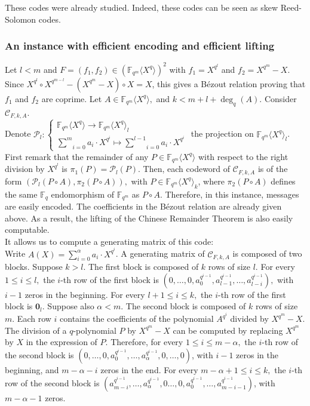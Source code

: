 \documentclass{article}
\newcommand{\Fq}{\mathbb{F}_q}
\newcommand{\Fqm}{\mathbb{F}_{q^m}}
\newcommand{\QP}{\mathbb{F}_{q^m} \langle X^q \rangle}
\theoremstyle{definition}
\begin{document}
\noindent These codes were already studied. Indeed, these codes can be seen as skew Reed-Solomon codes.


\subsubsection{An instance with efficient encoding and efficient lifting}

Let $l <m$ and $F=(f_1, f_2)\in (\QP)^2$ with $f_1 = X^{q^l}$ and $f_2=X^{q^m}-X$. Since $ X^{q^l} \circ X^{q^{m-l}}-(X^{q^m}-X)\circ X = X$, this gives a Bézout relation proving that $f_1$ and $f_2$ are coprime. Let $A\in \QP,$ and $k<m+l+\deg_q(A).$ Consider $\mathcal{C}_{F,k,A}$. \\
Denote $\mathcal{P}_l : \left\{\begin{array}{l}
            \QP \rightarrow \QP_{l} \\
            \underset{i = 0}{\overset{m}{\sum}} a_i \cdot X^{q^i} \mapsto \underset{i =
                                                                                0}{\overset{l-1}{\sum}} a_i \cdot X^{q^i}
      \end{array}\right.$ the projection on $\QP_{l}$. \\
First remark that the remainder of any $P \in \QP$ with respect to the right division by $X^{q^l}$ is $\pi_1(P)=\mathcal{P}_l(P)$.
Then, each codeword of $\mathcal{C}_{F,k,A}$ is of the form $(\mathcal{P}_l(P\circ A), \pi_2(P\circ A)),$ with $P \in \QP_{k}$, where $\pi_2(P\circ A)$ defines the same $\Fq$ endomorphism of $\Fqm$ as $P\circ A$.
Therefore, in this instance, messages are easily encoded. The coefficients in the Bézout relation are already given above. As a result, the lifting of the Chinese Remainder Theorem is also easily computable. \\
It allows us to compute a generating matrix of this code:\\
Write $\displaystyle A(X) =\sum_{i=0}^{\alpha} a_i\cdot X^{q^i}$. A generating matrix of $\mathcal{C}_{F,k,A}$ is composed of two blocks.
Suppose $k>l.$ The first block is composed of $k$ rows of size $l$.
For every $1 \leqslant i\leqslant l, $ the $i$-th row of the first block is $(0,\dots,0,a_0^{q^{i-1}}, a_{l-1}^{q^{i-1}}, \dots, a_{l-i}^{q^{i-1}}), $ with $i-1$ zeros in the beginning. For every $l+1 \leqslant i\leqslant k, $ the $i$-th row of the first block is $\mathbf{ 0}_{l}$. Suppose also $\alpha<m$.
The second block is composed of $k$ rows of size $m$. Each row $i$ contains the coefficients of the polynomial $A^{q^i}$ divided by $X^{q^m}-X.$ The division of a $q$-polynomial $P$ by $X^{q^m}-X$ can be computed by replacing $X^{q^m}$ by $X$ in the expression of $P$. Therefore, for every $1 \leqslant i\leqslant m-\alpha, $ the $i$-th row of the second block is $(0, \dots, 0, a_0^{q^{i-1}}, \dots, a_\alpha^{q^{i-1}}, 0 , \dots, 0)$,  with $i-1$ zeros in the beginning, and $m-\alpha-i$ zeros in the end.  For every $ m-\alpha+1 \leqslant i\leqslant k, $ the $i$-th row of the second block is $(a_{m-i}^{q^{i-1}}, \dots, a_{\alpha}^{q^{i-1}},0 \dots, 0, a_0^{q^{i-1}}, \dots, a_{m-i-1}^{q^{i-1}} )$, with $m-\alpha-1$ zeros.
\end{document}
